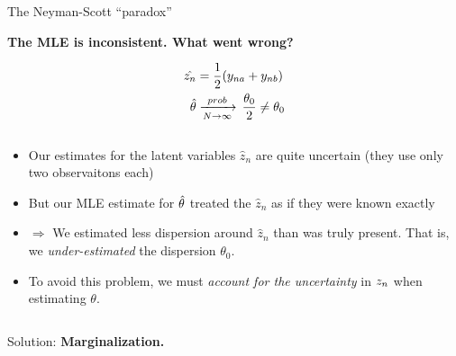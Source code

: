 
\begin{frame}{The Neyman-Scott ``paradox''}

\textbf{The MLE is inconsistent.  What went wrong?}

\begin{align*}
\hat{z_n} &= \frac{1}{2}(y_{na} + y_{nb}) \\
\hat\theta &\xrightarrow[N\rightarrow\infty]{prob}\, \frac{\theta_0}{2} \ne \theta_0
\end{align*}

\begin{columns}
    \begin{column}{0.8\textwidth}
\begin{itemize}
\item Our estimates for the latent variables $\hat{z}_n$ are quite uncertain (they use only
two observaitons each)
%
\item But our MLE estimate for $\hat\theta$ treated the $\hat{z}_n$ as if they
were known exactly
%
\item $\Rightarrow$ We estimated less dispersion around $\hat{z}_n$ than was
truly present.  That is, we \emph{under-estimated} the dispersion $\theta_0$.
%
\item To avoid this problem, we must \emph{account for the uncertainty} in $z_n$
when estimating $\theta$.
%
\end{itemize}
\end{column}
\end{columns}

\vspace{2em}
Solution: \textbf{Marginalization.}

\end{frame}





